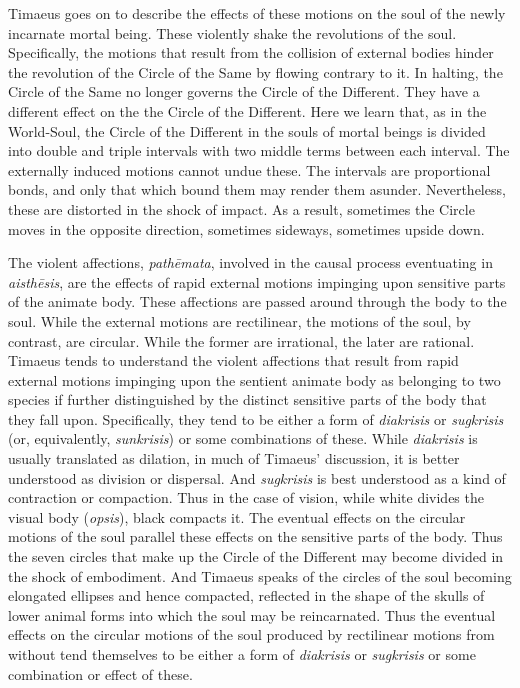 Timaeus goes on to describe the effects of these motions on the soul of the newly incarnate mortal being. These violently shake the revolutions of the soul. Specifically, the motions that result from the collision of external bodies hinder the revolution of the Circle of the Same by flowing contrary to it. In halting, the Circle of the Same no longer governs the Circle of the Different. They have a different effect on the the Circle of the Different. Here we learn that, as in the World-Soul, the Circle of the Different in the souls of mortal beings is divided into double and triple intervals with two middle terms between each interval. The externally induced motions cannot undue these. The intervals are proportional bonds, and only that which bound them may render them asunder. Nevertheless, these are distorted in the shock of impact. As a result, sometimes the Circle moves in the opposite direction, sometimes sideways, sometimes upside down. 

The violent affections, \emph{pathēmata}, involved in the causal process eventuating in \emph{aisthēsis}, are the effects of rapid external motions impinging upon sensitive parts of the animate body. These affections are passed around through the body to the soul. While the external motions are rectilinear, the motions of the soul, by contrast, are circular. While the former are irrational, the later are rational. Timaeus tends to understand the violent affections that result from rapid external motions impinging upon the sentient animate body as belonging to two species if further distinguished by the distinct sensitive parts of the body that they fall upon. Specifically, they tend to be either a form of \emph{diakrisis} or \emph{sugkrisis} (or, equivalently, \emph{sunkrisis}) or some combinations of these. While \emph{diakrisis} is usually translated as dilation, in much of Timaeus' discussion, it is better understood as division or dispersal. And \emph{sugkrisis} is best understood as a kind of contraction or compaction. Thus in the case of vision, while white divides the visual body (\emph{opsis}), black compacts it. The eventual effects on the circular motions of the soul parallel these effects on the sensitive parts of the body. Thus the seven circles that make up the Circle of the Different may become divided in the shock of embodiment. And Timaeus speaks of the circles of the soul becoming elongated ellipses and hence compacted, reflected in the shape of the skulls of lower animal forms into which the soul may be reincarnated. Thus the eventual effects on the circular motions of the soul produced by rectilinear motions from without tend themselves to be either a form of \emph{diakrisis} or \emph{sugkrisis} or some combination or effect of these.

